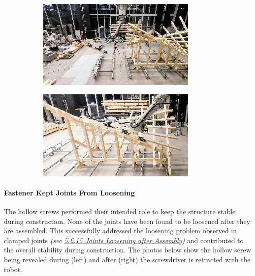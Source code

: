 \documentclass[11pt]{book}
\begin{document}
\begin{figure}[H]
\centering
\begin{subfigure}[b]{0.45\textwidth}
\centering
\includegraphics[width=\textwidth]{./images/image45.jpeg}
\end{subfigure}
\hfill
\begin{subfigure}[b]{0.45\textwidth}
\centering
\includegraphics[width=\textwidth]{./images/image46.jpeg}
\end{subfigure}
\end{figure}


\paragraph{Fastener Kept Joints From Loosening}

The hollow screws performed their intended role to keep the structure stable during construction. None of the joints have been found to be loosened after they are assembled. This successfully addressed the loosening problem observed in clamped joints \textit{(see \uline{5.6.15 Joints Loosening after Assembly})} and contributed to the overall stability during construction. The photos below show the hollow screw being revealed during (left) and after (right) the screwdriver is retracted with the robot.
\end{document}
